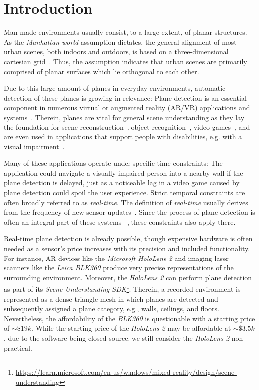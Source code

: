 \documentclass[main.tex]{subfiles}
\begin{document}
\chapter{Introduction}
\label{chap:Introduction}

Man-made environments usually consist, to a large extent, of planar structures.
As the \textit{Manhattan-world} assumption dictates, the general alignment of most urban scenes, both indoors and outdoors, is based on a three-dimensional cartesian grid~\cite{Coughlan_Yuille_1999}. Thus, the assumption indicates that urban scenes are primarily comprised of planar surfaces which lie orthogonal to each other.

Due to this large amount of planes in everyday environments, automatic detection of these planes is growing in relevance:
Plane detection is an essential component in numerous virtual or augmented reality (AR/VR) applications and systems~\cite{Jurado_Jurado_Ortega_Feito_2021, sridhar2020instant}.
Therein, planes are vital for general scene understanding as they lay the foundation for scene reconstruction~\cite{agarwala2022planeformers}, object recognition~\cite{Peternell_Steiner_2004, Qian_Ye_2014}, video games~\cite{ninja}, and are even used in applications that support people with disabilities, e.g. with a visual impairment~\cite{visimpaired, Schwarze_Lauer_Schwaab_Romanovas_Bohm_Jurgensohn_2015}.


Many of these applications operate under specific time constraints: The application could navigate a visually impaired person into a nearby wall if the plane detection is delayed, just as a noticeable lag in a video game caused by plane detection could spoil the user experience.
Strict temporal constraints are often broadly referred to as \textit{real-time}.
The definition of \textit{real-time} usually derives from the frequency of new sensor updates~\cite{Davison_2003}.
Since the process of plane detection is often an integral part of these systems ~\cite{Wang_Bu_Zhang_Cheng_2022, Dai_Lund_Gao_2022, Kaess_2015}, these constraints also apply there.

Real-time plane detection is already possible, though expensive hardware is often needed as a sensor's price increases
with its precision and included functionality.
For instance, AR devices like the \textit{Microsoft HoloLens 2} and imaging laser scanners like the \textit{Leica BLK360} produce very precise representations of the surrounding environment.
Moreover, the \textit{HoloLens 2} can perform plane detection as part of its \textit{Scene Understanding SDK}\footnote{\href{https://learn.microsoft.com/en-us/windows/mixed-reality/design/scene-understanding}{https://learn.microsoft.com/en-us/windows/mixed-reality/design/scene-understanding}}. Therein, a recorded environment is represented as a dense triangle mesh in which planes are detected and subsequently assigned a plane category, e.g., walls, ceilings, and floors.
Nevertheless, the affordability of the \textit{BLK360} is questionable with a starting price of ${\sim}\$19k$. While the starting price of the \textit{HoloLens 2} may be affordable at ${\sim}\$3.5k$, due to the software being closed source, we still consider the \textit{HoloLens 2} non-practical.
\end{document}
